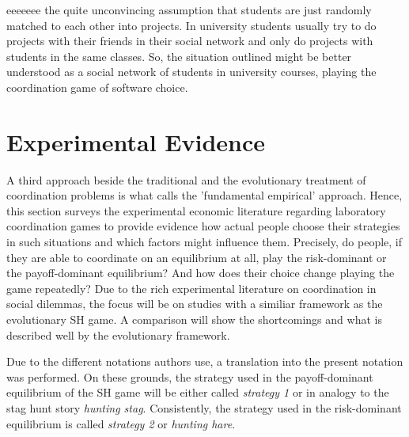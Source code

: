 \documentclass[11pt]{article}
\begin{document}
eeeeeee the quite unconvincing assumption that students are just randomly
matched to each other into projects. In university students usually try
to do projects with their friends in their social network and only do
projects with students in the same classes. So, the situation outlined 
might be better understood as a social network of students in 
university courses, playing the coordination game of software choice.











\section{Experimental Evidence}
\label{sec:experimentalevidence}
A third approach beside the traditional and the evolutionary treatment of 
coordination problems is what \textcite{camerer_behavioral_2003} calls the 
'fundamental empirical' approach.
Hence, this section surveys the experimental economic literature regarding 
laboratory coordination games to provide evidence how actual people choose
their strategies in such situations and which factors might influence them. 
Precisely, do people, if they are able to coordinate on an equilibrium at all,
play the risk-dominant or the payoff-dominant equilibrium? And how does their
choice change playing the game repeatedly?
Due to the rich experimental literature on coordination in social 
dilemmas, the focus will be on studies with a similiar framework as the
evolutionary SH game. A comparison will show the shortcomings and what
is described well by the evolutionary framework.
 
Due to the different notations authors use, a translation into the present
notation was performed.
On these grounds, the 
strategy used in the payoff-dominant equilibrium of the SH game will be 
either called  \textit{strategy 1} or in analogy to the stag hunt story 
\textit{hunting stag}.
Consistently, the strategy used in the risk-dominant equilibrium is called
\textit{strategy 2} or \textit{hunting hare}. 
\end{document}
